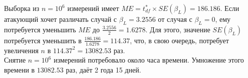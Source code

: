 Выборка из $n = 10^6$ измерений имеет $ME = t^{*}_{df} \times SE(\beta_L) = 186.186$.
Если атакующий хочет различать случай с $\beta_L = 3.2556$ от случая с $\beta_L = 0$,
ему потребуется уменьшить $ME$ до $\frac{3.2556}{2} = 1.6278$. Для этого,
значение $SE(\beta_L)$ потребуется уменьшить в $\frac{186.186}{1.6278} = 114.37$,
что, в свою очередь, потребует увеличения $n$ в $114.37^2 = 13082.53$ раз.
\\[0.5cm]
Снятие $n = 10^6$ измерений потребовало около часа времени. Умножение этого времени в $13082.53$
раз, даёт 2 года 15 дней.

\clearpage
